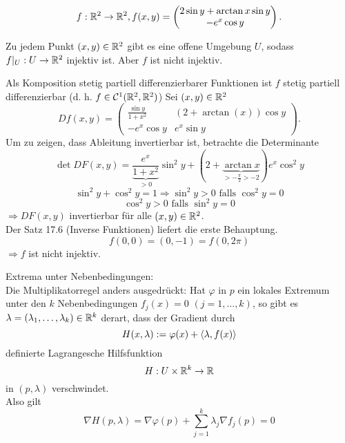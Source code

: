 \documentclass[../ana2u.tex]{subfiles}
\begin{document}
\begin{bsp}
    \[ f:\mathbb{R}^2\rightarrow \mathbb{R}^2, f(x,y) 
    = \begin{pmatrix}
        2\sin y + \arctan x \sin y \\
        -e^x \cos y
    \end{pmatrix}. \]
    \begin{beh}
        Zu jedem Punkt \( (x,y) \in \mathbb{R}^2 \) 
        gibt es eine offene Umgebung \(U\), 
        sodass \( f\vert_U:U\rightarrow \mathbb{R}^2 \) 
        injektiv ist. Aber \(f\) ist nicht injektiv.
    \end{beh}
    \begin{bew}
    Als Komposition stetig partiell differenzierbarer 
    Funktionen ist \(f\) stetig partiell differenzierbar 
    (d. h. \( f \in \mathcal{C}^1(\mathbb{R}^2, \mathbb{R}^2) \))
    Sei \((x,y) \in \mathbb{R}^2\) 
    \[ Df(x,y) = \begin{pmatrix}
        \frac{\sin y}{1+x^2} & (2+\arctan(x)) \cos y \\
        -e^x \cos y & e^x \sin y
    \end{pmatrix}. \]
    Um zu zeigen, dass Ableitung invertierbar ist, betrachte die 
    Determinante 
    \[ \det DF(x,y) = \underbrace{\frac{e^x}{1+x^2}}_{>0} \sin^2 y 
    + (2 + \underbrace{\arctan x}_{> - \frac{\pi}{2} > -2})e^x \cos^2 y \]
    \[ \sin^2 y + \cos^2 y = 1 \Rightarrow \sin^2 y > 0 \text{ falls } \cos^2 y = 0 \]
    \[ \cos^2 y > 0 \text{ falls } \sin^2 y = 0 \]
    \( \Rightarrow DF(x,y) \) invertierbar für alle \( (x,y) \in \mathbb{R}^2 \).\\
    Der Satz 17.6 (Inverse Funktionen) liefert die erste Behauptung.
    \[ f(0,0) = (0, -1) = f(0, 2\pi) \]
    \( \Rightarrow f \) ist nicht injektiv.
    \end{bew}
\end{bsp}
Extrema unter Nebenbedingungen:\\
Die Multiplikatorregel anders ausgedrückt: Hat \(\varphi\) in \(p\)
ein lokales Extremum unter den \(k\) Nebenbedingungen \(f_j(x) = 0\)
\( (j=1,\ldots, k) \), so gibt es \(\lambda = (\lambda_1, \ldots, \lambda_k)\in \mathbb{R}^k\)
derart, dass der Gradient durch
\[ H(x, \lambda) := \varphi(x) + \langle \lambda, f(x) \rangle \]
definierte Lagrangesche Hilfsfunktion
\[ H:U \times \mathbb{R}^k\rightarrow \mathbb{R} \]
in \((p, \lambda)\) verschwindet.\\
Also gilt
\[ \nabla H(p, \lambda) 
= \nabla \varphi(p) + \sum_{j=1}^k \lambda_j \nabla f_j(p) = 0 \]
\end{document}
